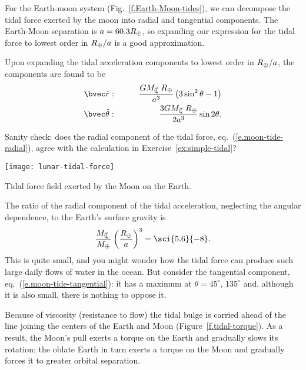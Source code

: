 For the Earth-moon system (Fig.~\ref{f.Earth-Moon-tides}), we can decompose the tidal force exerted by the moon into radial and tangential components.  The Earth-Moon separation is $a = 60.3 R_{\oplus}$, so expanding our expression for the tidal force to lowest order in $R_{\oplus}/a$ is a good approximation.

Upon expanding the tidal acceleration components to lowest order in $R_{\oplus}/a$, the components are found to be
\begin{eqnarray}
\label{e.moon-tide-radial}\rhat: &\qquad& \frac{GM_{\Moon}R_{\Earth}}{a^{3}}\left(3\sin^{2}\theta - 1\right)\\
\label{e.moon-tide-tangential}\thetahat: &\qquad& \frac{3GM_{\Moon}R_{\Earth}}{2a^{3}}\sin2\theta.
\end{eqnarray}
\begin{exercisebox}
Sanity check: does the radial component of the tidal force, eq.~(\ref{e.moon-tide-radial}), agree with the calculation in Exercise~\ref{ex:simple-tidal}?
\end{exercisebox}
\begin{marginfigure}[5\baselineskip]
\texttt{[image: lunar-tidal-force]}
\caption[Components of the tidal force]{Tidal force field exerted by the Moon on the Earth.
\label{f.lunar-tidal-force}}
\end{marginfigure}
\noindent The ratio of the radial component of the tidal acceleration, neglecting the angular dependence, to the Earth's surface gravity is
\[ \frac{M_{\Moon}}{M_{\Earth}}\left(\frac{R_{\Earth}}{a}\right)^{3} = \sci{5.6}{-8}. \]
This is quite small, and you might wonder how the tidal force can produce such large daily flows of water in the ocean.  But consider the tangential component, eq.~(\ref{e.moon-tide-tangential}): it has a maximum at $\theta = 45^{\circ},\,135^{\circ}$ and, although it is also small, there is nothing to oppose it.

 Because of viscosity (resistance to flow) the tidal bulge is carried ahead of the line joining the centers of the Earth and Moon (Figure~\ref{f.tidal-torque}).  As a result, the Moon's pull exerts a torque on the Earth and gradually slows its rotation; the oblate Earth in turn exerts a torque on the Moon and gradually forces it to greater orbital separation.

